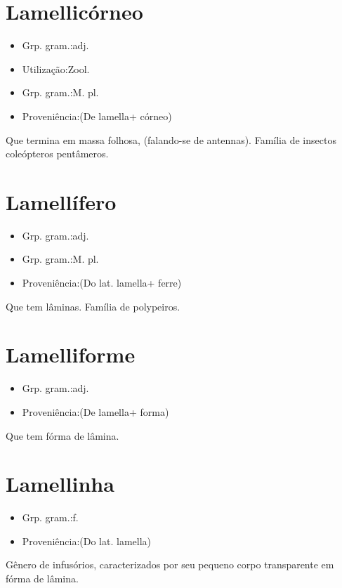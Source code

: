 \section{Lamellicórneo}
\begin{itemize}
\item {Grp. gram.:adj.}
\end{itemize}
\begin{itemize}
\item {Utilização:Zool.}
\end{itemize}
\begin{itemize}
\item {Grp. gram.:M. pl.}
\end{itemize}
\begin{itemize}
\item {Proveniência:(De \textunderscore lamella\textunderscore  + \textunderscore córneo\textunderscore )}
\end{itemize}
Que termina em massa folhosa, (falando-se de antennas).
Família de insectos coleópteros pentâmeros.
\section{Lamellífero}
\begin{itemize}
\item {Grp. gram.:adj.}
\end{itemize}
\begin{itemize}
\item {Grp. gram.:M. pl.}
\end{itemize}
\begin{itemize}
\item {Proveniência:(Do lat. \textunderscore lamella\textunderscore  + \textunderscore ferre\textunderscore )}
\end{itemize}
Que tem lâminas.
Família de polypeiros.
\section{Lamelliforme}
\begin{itemize}
\item {Grp. gram.:adj.}
\end{itemize}
\begin{itemize}
\item {Proveniência:(De \textunderscore lamella\textunderscore  + \textunderscore forma\textunderscore )}
\end{itemize}
Que tem fórma de lâmina.
\section{Lamellinha}
\begin{itemize}
\item {Grp. gram.:f.}
\end{itemize}
\begin{itemize}
\item {Proveniência:(Do lat. \textunderscore lamella\textunderscore )}
\end{itemize}
Gênero de infusórios, caracterizados por seu pequeno corpo transparente em fórma de lâmina.
